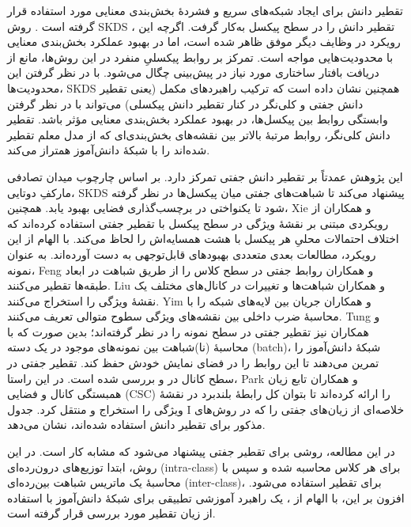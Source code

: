تقطیر دانش برای ایجاد شبکه‌های سریع و فشردهٔ بخش‌بندی معنایی مورد استفاده قرار گرفته است \cite{heo2019comprehensiveoverhaulfeaturedistillation} \cite{yang2022crossimagerelationalknowledgedistillation}. روش SKDS \cite{Liu_2019_CVPR}، تقطیر دانش را در سطح پیکسل به‌کار گرفت. اگرچه این رویکرد در وظایف دیگر موفق ظاهر شده است، اما در بهبود عملکرد بخش‌بندی معنایی با محدودیت‌هایی مواجه است. تمرکز بر روابط پیکسلیِ منفرد در این روش‌ها، مانع از دریافت بافتار ساختاری مورد نیاز در پیش‌بینی چگال می‌شود. با در نظر گرفتن این محدودیت‌ها، SKDS همچنین نشان داده است که ترکیب راهبردهای مکمل (یعنی تقطیر دانش جفتی و کلی‌نگر در کنار تقطیر دانش پیکسلی) می‌تواند با در نظر گرفتن وابستگی روابط بین پیکسل‌ها، در بهبود عملکرد بخش‌بندی معنایی مؤثر باشد. تقطیر دانش کلی‌نگر، روابط مرتبهٔ بالاتر بین نقشه‌های بخش‌بندی‌ای که از مدل معلم تقطیر شده‌اند را با شبکهٔ دانش‌آموز همتراز می‌کند.

این پژوهش عمدتاً بر تقطیر دانش جفتی تمرکز دارد. بر اساس چارچوب میدان تصادفی مارکفِ دوتایی، SKDS پیشنهاد می‌کند تا شباهت‌های جفتی میان پیکسل‌ها در نظر گرفته شود تا یکنواختی در برچسب‌گذاری فضایی بهبود یابد. همچنین، Xie و همکاران \cite{xie2018improvingfastsegmentationteacherstudent} از رویکردی مبتنی بر نقشهٔ ویژگی در سطح پیکسل با تقطیر جفتی استفاده کرده‌اند که اختلاف احتمالات محلیِ هر پیکسل با هشت همسایه‌اش را لحاظ می‌کند. با الهام از این رویکرد، مطالعات بعدی متعددی بهبودهای قابل‌توجهی به دست آورده‌اند. به عنوان نمونه، Feng و همکاران \cite{Feng_2021} روابط جفتی در سطح کلاس را از طریق شباهت در ابعاد طبقه‌ها تقطیر می‌کنند. Liu و همکاران \cite{liu2022exploringinterchannelcorrelationdiversitypreserved} شباهت‌ها و تغییرات در کانال‌های مختلف یک نقشهٔ ویژگی را استخراج می‌کنند. Yim و همکاران \cite{8100237} جریان بین لایه‌های شبکه را با محاسبهٔ ضرب داخلی بین نقشه‌های ویژگی سطوح متوالی تعریف می‌کنند. Tung و همکاران \cite{tung2019similaritypreservingknowledgedistillation} نیز تقطیر جفتی در سطح نمونه را در نظر گرفته‌اند؛ بدین صورت که با محاسبهٔ (نا)شباهت بین نمونه‌های موجود در یک دسته (batch)، شبکهٔ دانش‌آموز را تمرین می‌دهند تا این روابط را در فضای نمایش خودش حفظ کند. تقطیر جفتی در سطح کانال در \cite{s20164616} و \cite{liu2022exploringinterchannelcorrelationdiversitypreserved} بررسی شده است. در این راستا، Park و همکاران \cite{s20164616} تابع زیان همبستگی کانال و فضایی (CSC) را ارائه کرده‌اند تا بتوان کل رابطهٔ بلندبرد در نقشهٔ ویژگی را استخراج و منتقل کرد. جدول I خلاصه‌ای از زیان‌های جفتی را که در روش‌های مذکور برای تقطیر دانش استفاده شده‌اند، نشان می‌دهد.

در این مطالعه، روشی برای تقطیر جفتی پیشنهاد می‌شود که مشابه کار \cite{liu2022exploringinterchannelcorrelationdiversitypreserved} است. در این روش، ابتدا توزیع‌های درون‌رده‌ای (intra-class) برای هر کلاس محاسبه شده و سپس با محاسبهٔ یک ماتریس شباهت بین‌رده‌ای (inter-class)، برای تقطیر استفاده می‌شود. افزون بر این، با الهام از \cite{zhou2020channeldistillationchannelwiseattention}، یک راهبرد آموزشی تطبیقی برای شبکهٔ دانش‌آموز با استفاده از زیان تقطیر مورد بررسی قرار گرفته است.


